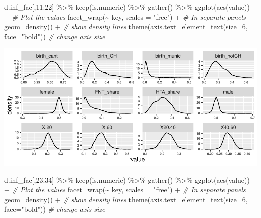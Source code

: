 \documentclass[
]{article}
\newenvironment{Shaded}{\begin{snugshade}}{\end{snugshade}}
\newcommand{\AttributeTok}[1]{\textcolor[rgb]{0.77,0.63,0.00}{#1}}
\newcommand{\CommentTok}[1]{\textcolor[rgb]{0.56,0.35,0.01}{\textit{#1}}}
\newcommand{\DecValTok}[1]{\textcolor[rgb]{0.00,0.00,0.81}{#1}}
\newcommand{\FunctionTok}[1]{\textcolor[rgb]{0.00,0.00,0.00}{#1}}
\newcommand{\NormalTok}[1]{#1}
\newcommand{\SpecialCharTok}[1]{\textcolor[rgb]{0.00,0.00,0.00}{#1}}
\newcommand{\StringTok}[1]{\textcolor[rgb]{0.31,0.60,0.02}{#1}}
\begin{document}
\begin{Shaded}
\begin{Highlighting}[]
\NormalTok{d.inf\_fac[,}\DecValTok{11}\SpecialCharTok{:}\DecValTok{22}\NormalTok{] }\SpecialCharTok{\%\textgreater{}\%}
  \FunctionTok{keep}\NormalTok{(is.numeric) }\SpecialCharTok{\%\textgreater{}\%}
  \FunctionTok{gather}\NormalTok{() }\SpecialCharTok{\%\textgreater{}\%}
  \FunctionTok{ggplot}\NormalTok{(}\FunctionTok{aes}\NormalTok{(value))  }\SpecialCharTok{+}                   \CommentTok{\# Plot the values}
    \FunctionTok{facet\_wrap}\NormalTok{(}\SpecialCharTok{\textasciitilde{}}\NormalTok{ key, }\AttributeTok{scales =} \StringTok{"free"}\NormalTok{) }\SpecialCharTok{+}  \CommentTok{\# In separate panels}
    \FunctionTok{geom\_density}\NormalTok{() }\SpecialCharTok{+}                      \CommentTok{\# show density lines}
    \FunctionTok{theme}\NormalTok{(}\AttributeTok{axis.text=}\FunctionTok{element\_text}\NormalTok{(}\AttributeTok{size=}\DecValTok{6}\NormalTok{, }\AttributeTok{face=}\StringTok{"bold"}\NormalTok{)) }\CommentTok{\# change axis size}
\end{Highlighting}
\end{Shaded}

\includegraphics{Lin_Mod_Clus_Anal_files/figure-latex/unnamed-chunk-4-2.pdf}

\begin{Shaded}
\begin{Highlighting}[]
\NormalTok{d.inf\_fac[,}\DecValTok{23}\SpecialCharTok{:}\DecValTok{34}\NormalTok{] }\SpecialCharTok{\%\textgreater{}\%}
  \FunctionTok{keep}\NormalTok{(is.numeric) }\SpecialCharTok{\%\textgreater{}\%}
  \FunctionTok{gather}\NormalTok{() }\SpecialCharTok{\%\textgreater{}\%}
  \FunctionTok{ggplot}\NormalTok{(}\FunctionTok{aes}\NormalTok{(value))  }\SpecialCharTok{+}                   \CommentTok{\# Plot the values}
    \FunctionTok{facet\_wrap}\NormalTok{(}\SpecialCharTok{\textasciitilde{}}\NormalTok{ key, }\AttributeTok{scales =} \StringTok{"free"}\NormalTok{) }\SpecialCharTok{+}  \CommentTok{\# In separate panels}
    \FunctionTok{geom\_density}\NormalTok{() }\SpecialCharTok{+}                      \CommentTok{\# show density lines}
    \FunctionTok{theme}\NormalTok{(}\AttributeTok{axis.text=}\FunctionTok{element\_text}\NormalTok{(}\AttributeTok{size=}\DecValTok{6}\NormalTok{, }\AttributeTok{face=}\StringTok{"bold"}\NormalTok{)) }\CommentTok{\# change axis size}
\end{Highlighting}
\end{Shaded}
\end{document}
